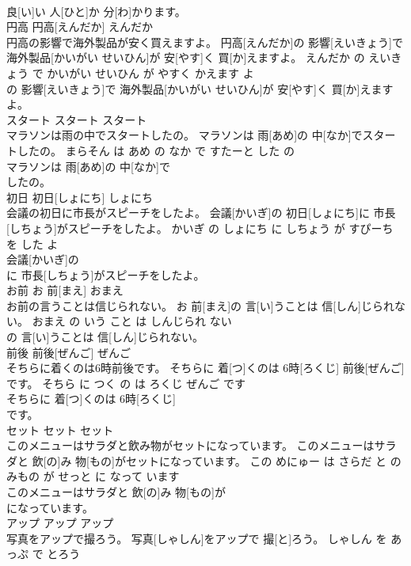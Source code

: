 \documentclass[8pt]{extreport}
\begin{document}
\begin{CJK}{UTF8}{min}
\\	良[い]い 人[ひと]か 分[わ]かります。			
\\	円高	円高[えんだか]	えんだか	
\\	円高の影響で海外製品が安く買えますよ。	円高[えんだか]の 影響[えいきょう]で 海外製品[かいがい せいひん]が 安[やす]く 買[か]えますよ。	えんだか の えいきょう で かいがい せいひん が やすく かえます よ	
\\	の 影響[えいきょう]で 海外製品[かいがい せいひん]が 安[やす]く 買[か]えますよ。			
\\	スタート	スタート	スタート	
\\	マラソンは雨の中でスタートしたの。	マラソンは 雨[あめ]の 中[なか]でスタートしたの。	まらそん は あめ の なか で すたーと した の	
\\	マラソンは 雨[あめ]の 中[なか]で
\\	したの。			
\\	初日	初日[しょにち]	しょにち	
\\	会議の初日に市長がスピーチをしたよ。	会議[かいぎ]の 初日[しょにち]に 市長[しちょう]がスピーチをしたよ。	かいぎ の しょにち に しちょう が すぴーち を した よ	
\\	会議[かいぎ]の
\\	に 市長[しちょう]がスピーチをしたよ。			
\\	お前	お 前[まえ]	おまえ	
\\	お前の言うことは信じられない。	お 前[まえ]の 言[い]うことは 信[しん]じられない。	おまえ の いう こと は しんじられ ない	
\\	の 言[い]うことは 信[しん]じられない。			
\\	前後	前後[ぜんご]	ぜんご	
\\	そちらに着くのは6時前後です。	そちらに 着[つ]くのは 6時[ろくじ] 前後[ぜんご]です。	そちら に つく の は ろくじ ぜんご です	
\\	そちらに 着[つ]くのは 6時[ろくじ]
\\	です。			
\\	セット	セット	セット	
\\	このメニューはサラダと飲み物がセットになっています。	このメニューはサラダと 飲[の]み 物[もの]がセットになっています。	この めにゅー は さらだ と のみもの が せっと に なって います	
\\	このメニューはサラダと 飲[の]み 物[もの]が
\\	になっています。			
\\	アップ	アップ	アップ	
\\	写真をアップで撮ろう。	写真[しゃしん]をアップで 撮[と]ろう。	しゃしん を あっぷ で とろう	

\end{CJK}
\end{document}
